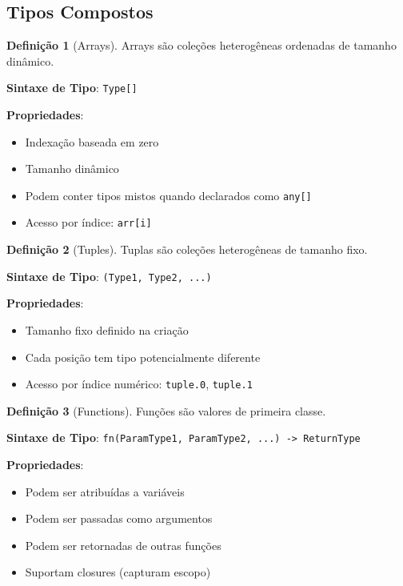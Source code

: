 \documentclass[12pt,a4paper]{article}
\theoremstyle{definition}
\newtheorem{definition}{Definição}[section]
\begin{document}
\subsection{Tipos Compostos}

\begin{definition}[Arrays]
Arrays são coleções heterogêneas ordenadas de tamanho dinâmico.

\textbf{Sintaxe de Tipo}: \texttt{Type[]}

\textbf{Propriedades}:
\begin{itemize}
    \item Indexação baseada em zero
    \item Tamanho dinâmico
    \item Podem conter tipos mistos quando declarados como \texttt{any[]}
    \item Acesso por índice: \texttt{arr[i]}
\end{itemize}
\end{definition}

\begin{definition}[Tuples]
Tuplas são coleções heterogêneas de tamanho fixo.

\textbf{Sintaxe de Tipo}: \texttt{(Type1, Type2, ...)}

\textbf{Propriedades}:
\begin{itemize}
    \item Tamanho fixo definido na criação
    \item Cada posição tem tipo potencialmente diferente
    \item Acesso por índice numérico: \texttt{tuple.0}, \texttt{tuple.1}
\end{itemize}
\end{definition}

\begin{definition}[Functions]
Funções são valores de primeira classe.

\textbf{Sintaxe de Tipo}: \texttt{fn(ParamType1, ParamType2, ...) -> ReturnType}

\textbf{Propriedades}:
\begin{itemize}
    \item Podem ser atribuídas a variáveis
    \item Podem ser passadas como argumentos
    \item Podem ser retornadas de outras funções
    \item Suportam closures (capturam escopo)
\end{itemize}
\end{definition}
\end{document}
